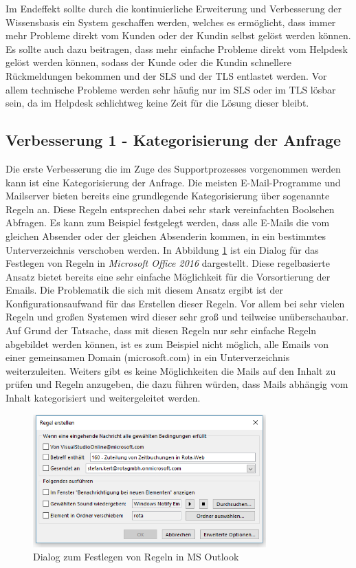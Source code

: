 Im Endeffekt sollte durch die kontinuierliche Erweiterung und Verbesserung der Wissensbasis ein System geschaffen werden, welches es ermöglicht, dass immer mehr Probleme direkt vom Kunden oder der Kundin selbst gelöst werden können. Es sollte auch dazu beitragen, dass mehr einfache Probleme direkt vom Helpdesk gelöst werden können, sodass der Kunde oder die Kundin schnellere Rückmeldungen bekommen und der SLS und der TLS entlastet werden. Vor allem technische Probleme werden sehr häufig nur im SLS oder im TLS lösbar sein, da im Helpdesk schlichtweg keine Zeit für die Lösung dieser bleibt. 

\subsection{Verbesserung 1 - Kategorisierung der Anfrage}
\label{sec:improvement1}
Die erste Verbesserung die im Zuge des Supportprozesses vorgenommen werden kann ist eine Kategorisierung der Anfrage. Die meisten E-Mail-Programme und Mailserver bieten bereits eine grundlegende Kategorisierung über sogenannte Regeln an. Diese Regeln entsprechen dabei sehr stark vereinfachten Boolschen Abfragen. Es kann zum Beispiel festgelegt werden, dass alle E-Mails die vom gleichen Absender oder der gleichen Absenderin kommen, in ein bestimmtes Unterverzeichnis verschoben werden. In Abbildung \ref{fig:outlook-rules} ist ein Dialog für das Festlegen von Regeln in \textit{Microsoft Office 2016} dargestellt. Diese regelbasierte Ansatz bietet bereits eine sehr einfache Möglichkeit für die Vorsortierung der Emails. Die Problematik die sich mit diesem Ansatz ergibt ist der Konfigurationsaufwand für das Erstellen dieser Regeln. Vor allem bei sehr vielen Regeln und großen Systemen wird dieser sehr groß und teilweise unüberschaubar. Auf Grund der Tatsache, dass mit diesen Regeln nur sehr einfache Regeln abgebildet werden können, ist es zum Beispiel nicht möglich, alle Emails von einer gemeinsamen Domain (microsoft.com) in ein Unterverzeichnis weiterzuleiten. Weiters gibt es keine Möglichkeiten die Mails auf den Inhalt zu prüfen und Regeln anzugeben, die dazu führen würden, dass Mails abhängig vom Inhalt kategorisiert und weitergeleitet werden.

\begin{figure}[ht]
	\centering
		\includegraphics[width=0.80\textwidth]{images/outlook_rules.PNG}
	\caption{Dialog zum Festlegen von Regeln in MS Outlook}
	\label{fig:outlook-rules}
\end{figure}

